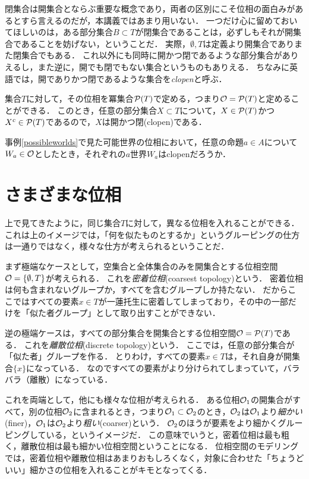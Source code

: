 \documentclass[11pt,a4paper]{jsarticle}
\begin{document}
閉集合は開集合とならぶ重要な概念であり，両者の区別にこそ位相の面白みがあるとすら言えるのだが，本講義ではあまり用いない．
一つだけ心に留めておいてほしいのは，ある部分集合$B \subset T$が閉集合であることは，必ずしもそれが開集合であることを妨げない，ということだ．
実際，$\emptyset, T$は定義より開集合でありまた閉集合でもある．
これ以外にも同時に開かつ閉であるような部分集合がありえるし，また逆に，開でも閉でもない集合というものもありえる．
ちなみに英語では，開でありかつ閉であるような集合を\emph{clopen}と呼ぶ．

\begin{example}
 集合$T$に対して，その位相を冪集合$\mathcal{P}(T)$で定める，つまり$\mathcal{O} = \mathcal{P}(T)$と定めることができる．
 このとき，任意の部分集合$X \subset T$について，$X \in \mathcal{P}(T)$かつ$X^c \in \mathcal{P}(T)$であるので，$X$は開かつ閉(clopen)である．
\end{example}

\begin{example}
 事例\ref{possibleworlds}で見た可能世界の位相において，任意の命題$a \in A$について$W_a \in \mathcal{O}$としたとき，それぞれの$a$世界$W_a$はclopenだろうか．
\end{example}


\section{さまざまな位相}
上で見てきたように，同じ集合$T$に対して，異なる位相を入れることができる．
これは上のイメージでは，「何を似たものとするか」というグルーピングの仕方は一通りではなく，様々な仕方が考えられるということだ．

まず極端なケースとして，空集合と全体集合のみを開集合とする位相空間$\mathcal{O} = \{\emptyset, T\}$が考えられる．
これを\emph{密着位相}(coarsest topology)という．
密着位相は何も含まれないグループか，すべてを含むグループしか持たない．
だからここではすべての要素$x \in T$が一蓮托生に密着してしまっており，その中の一部だけを「似た者グループ」として取り出すことができない．

逆の極端ケースは，すべての部分集合を開集合とする位相空間$\mathcal{O} = \mathcal{P}(T)$である．
これを\emph{離散位相}(discrete topology)という．
ここでは，任意の部分集合が「似た者」グループを作る．
とりわけ，すべての要素$x \in T$は，それ自身が開集合$\{x\}$になっている．
なのですべての要素がより分けられてしまっていて，バラバラ（離散）になっている．

これを両端として，他にも様々な位相が考えられる．
ある位相$\mathcal{O}_1$の開集合がすべて，別の位相$\mathcal{O}_2$に含まれるとき，つまり$\mathcal{O}_1 \subset \mathcal{O}_2$のとき，$\mathcal{O}_2$は$\mathcal{O}_1$より\emph{細かい}(finer)，$\mathcal{O}_1$は$\mathcal{O}_2$より\emph{粗い}(coarser)という．
$\mathcal{O}_2$のほうが要素をより細かくグルーピングしている，というイメージだ．
この意味でいうと，密着位相は最も粗く，離散位相は最も細かい位相空間ということになる．
位相空間のモデリングでは，密着位相や離散位相はあまりおもしろくなく，対象に合わせた「ちょうどいい」細かさの位相を入れることがキモとなってくる．
\end{document}
